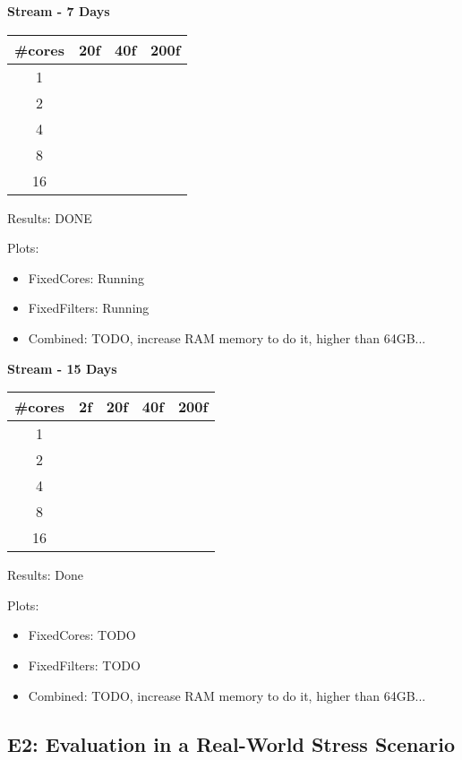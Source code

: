 \textbf{Stream - 7 Days}
\begin{table}[H]
    \begin{tabular}{|c|c|c|c|}
    \hline
    \#cores & 20f & 40f & 200f \\ \hline
    1       &     &     &      \\ \hline
    2       &     &     &      \\ \hline
    4       &     &     &      \\ \hline
    8       &     &     &      \\ \hline
    16      &     &     &      \\ \hline
    \end{tabular}
\end{table}

Results: DONE

Plots:
\begin{itemize}
    \item FixedCores: Running
    \item FixedFilters: Running
    \item Combined: TODO, increase RAM memory to do it, higher than 64GB...
\end{itemize}


\textbf{Stream - 15 Days}
\begin{table}[H]
    \begin{tabular}{|c|c|c|c|c|}
    \hline
    \#cores & 2f & 20f & 40f & 200f \\ \hline
    1       &    &     &     &      \\ \hline
    2       &    &     &     &      \\ \hline
    4       &    &     &     &      \\ \hline
    8       &    &     &     &      \\ \hline
    16      &    &     &     &      \\ \hline
    \end{tabular}
\end{table}

Results: Done

Plots:
\begin{itemize}
    \item FixedCores: TODO
    \item FixedFilters: TODO
    \item Combined: TODO, increase RAM memory to do it, higher than 64GB...
\end{itemize}

\subsection*{E2: Evaluation in a Real-World Stress Scenario}

